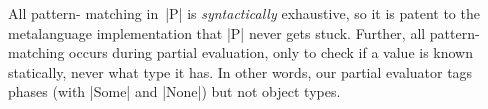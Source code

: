 \noindent All pattern\hyp
matching in~|P| is \emph{syntactically} exhaustive, so it is patent to the
metalanguage implementation that |P| never gets stuck.  Further, all
pattern\hyp matching occurs
during partial evaluation, only to check if a value is known statically,
never what type it has.  In other words, our partial evaluator tags
phases (with |Some| and |None|) but not object types.

